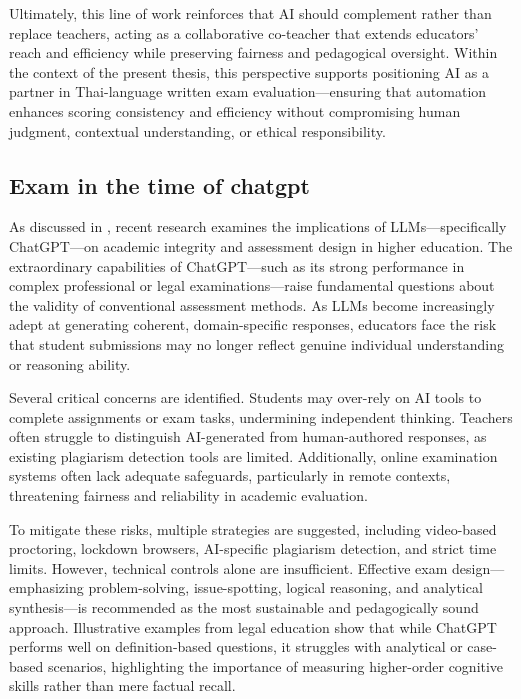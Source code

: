 Ultimately, this line of work reinforces that AI should 
complement rather than replace teachers, acting as a collaborative 
co-teacher that extends educators’ reach and efficiency while 
preserving fairness and pedagogical oversight. Within the 
context of the present thesis, this perspective supports 
positioning AI as a partner in Thai-language written exam 
evaluation—ensuring that automation enhances scoring 
consistency and efficiency without compromising human judgment, 
contextual understanding, or ethical responsibility.


\subsection{Exam in the time of chatgpt}

As discussed in \cite{Ryznar2023}, recent research examines 
the implications of LLMs—specifically ChatGPT—on academic 
integrity and assessment design in higher education. The 
extraordinary capabilities of ChatGPT—such as its strong 
performance in complex professional or legal 
examinations—raise fundamental questions about the validity 
of conventional assessment methods. As LLMs become 
increasingly adept at generating coherent, domain-specific 
responses, educators face the risk that student submissions 
may no longer reflect genuine individual understanding or 
reasoning ability.

Several critical concerns are identified. Students may over-rely 
on AI tools to complete assignments or exam tasks, undermining 
independent thinking. Teachers often struggle to distinguish 
AI-generated from human-authored responses, as existing 
plagiarism detection tools are limited. Additionally, online 
examination systems often lack adequate safeguards, 
particularly in remote contexts, threatening fairness and 
reliability in academic evaluation.

To mitigate these risks, multiple strategies are suggested, 
including video-based proctoring, lockdown browsers, 
AI-specific plagiarism detection, and strict time limits. 
However, technical controls alone are insufficient. Effective 
exam design—emphasizing problem-solving, issue-spotting, 
logical reasoning, and analytical synthesis—is recommended as 
the most sustainable and pedagogically sound approach. 
Illustrative examples from legal education show that while 
ChatGPT performs well on definition-based questions, it 
struggles with analytical or case-based scenarios, 
highlighting the importance of measuring higher-order 
cognitive skills rather than mere factual recall.

